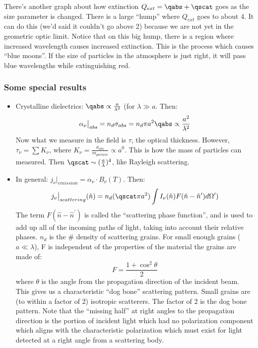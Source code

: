 \documentclass{article}
\def\eval#1{\big|_{#1}}
\def\eval#1{\big|_{#1}}
\begin{document}
\def\qext{Q_{ext}}
There's another graph about how extinction $\qext = \qabs + \qscat$ goes as
the size parameter is changed.  There is a large ``hump'' where $\qext$ goes to
about 4.  It can do this (we'd said it couldn't go above 2) because we are not
yet in the geometric optic limit.  Notice that on this big hump, there is a
region where increased wavelength causes increased extinction.  This is the
process which causes ``blue moons''.  If the size of particles in the atmosphere
is just right, it will pass blue wavelengths while extinguishing red.\par

\subsubsection*{Some special results}

\def\sabs{\sigma_{abs}}
\begin{itemize}
\item  Crystalline dielectrics: $\qabs \propto \frac{a}{ \lambda^2}$ (for
$\lambda \gg a$.  Then:
$$\alpha_\nu \eval{abs} = n_d\sabs = n_d\pi a^2\qabs
\propto \frac{a^2}{ \lambda^2}$$
Now what we measure in the field is $\tau$, the
optical thickness.  However, $\tau_\nu = \sum{K_\nu}$, where $K_\nu = 
\frac{\sabs}{ m_{particle}} \propto a^0$.  This is how the mass of 
particles can measured. Then $\qscat \sim (\frac{a}{ \lambda})^4$, like
Rayleigh scattering.
\item  In general: $j_\nu\eval{emission} = \alpha_\nu \cdot B_\nu(T)$.
Then:
$$j_\nu\eval{scattering}(\hat n) = n_d(\qscat\pi a^2)\int{I_\nu(\hat n)
F(\hat n-\hat n^\prime)d\Omega^\prime)}$$
The term $F(\hat n - \hat n^\prime)$ is called the ``scattering phase function'', and
is used to add up all of the incoming paths of light, taking into account their
relative phases.  $n_d$ is the \# density of scattering grains.  For small
enough grains ($a\ll \lambda$), F is independent of the properties of the
material the grains are made of:
$$F = \frac{1+\cos^2\theta}{2}$$
where $\theta$ is the angle from the propagation direction of the incident beam.
This gives us a characteristic ``dog bone'' scattering pattern. Small grains
are (to within a factor of 2) isotropic scatterers.  The factor of 2 is the 
dog bone pattern.  Note that the ``missing half'' at right angles to the
propagation direction is the portion of incident light which had no polarization
component which aligns with the characteristic polarization which must exist
for light detected at a right angle from a scattering body.
\end{itemize}
\end{document}
